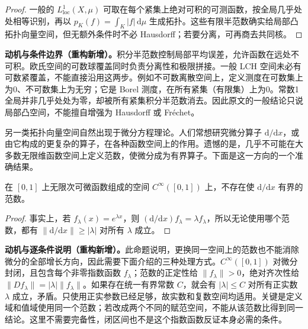 \documentclass[../../main.tex]{subfiles}
\begin{document}
\begin{examples}
\begin{itemize}
\begin{proof}
一般的 $L^1_{\mathrm{loc}}(X,\mu)$ 可取在每个紧集上绝对可积的可测函数，按全局几乎处处相等识别，再以 $p_K(f)=\int_K|f|\,\mathrm d\mu$ 生成拓扑。这些有限半范数确实给局部凸拓扑向量空间，但无额外条件时不必 Hausdorff；若要分离，可再商去共同核。
\end{proof}
\begin{remark}
\textbf{动机与条件边界（重构新增）。}积分半范数控制局部平均误差，允许函数在远处不可积。欧氏空间的可数球覆盖同时负责分离性和极限拼接。一般 LCH 空间未必有可数紧覆盖，不能直接沿用这两步。例如不可数离散空间上，定义测度在可数集上为0、不可数集上为无穷；它是 Borel 测度，在所有紧集（有限集）上为0。常数1全局并非几乎处处为零，却被所有紧集积分半范数消去。因此原文的一般结论只说局部凸空间，不能擅自增强为 Hausdorff 或 Fr\'echet。
\end{remark}
\end{itemize}
\end{examples}
另一类拓扑向量空间自然出现于微分方程理论。人们常想研究微分算子 $\mathrm d/\mathrm dx$，或由它构成的更复杂的算子，在各种函数空间上的作用。遗憾的是，几乎不可能在大多数无限维函数空间上定义范数，使微分成为有界算子。下面是这一方向的一个准确结果。
\begin{proposition}\label{proposition:ch05-differentiation-no-bounded-norm}
在 $[0,1]$ 上无限次可微函数组成的空间 $C^\infty([0,1])$ 上，不存在使 $\mathrm d/\mathrm dx$ 有界的范数。
\end{proposition}
\begin{proof}
事实上，若 $f_\lambda(x)=e^{\lambda x}$，则 $(\mathrm d/\mathrm dx)f_\lambda=\lambda f_\lambda$，所以无论使用哪个范数，都有 $\|\mathrm d/\mathrm dx\|\ge|\lambda|$ 对所有 $\lambda$ 成立。
\end{proof}
\begin{remark}
\textbf{动机与逐条件说明（重构新增）。}此命题说明，更换同一空间上的范数也不能消除微分的全部增长方向，因此需要下面介绍的三种处理方式。$C^\infty([0,1])$ 对微分封闭，且包含每个非零指数函数 $f_\lambda$；范数的正定性给 $\|f_\lambda\|>0$，绝对齐次性给 $\|Df_\lambda\|=|\lambda|\|f_\lambda\|$。如果存在统一有界常数 $C$，就会有 $|\lambda|\le C$ 对所有正实数 $\lambda$ 成立，矛盾。只使用正实参数已经足够，故实数和复数空间均适用。关键是定义域和值域使用同一个范数；若改成两个不同的赋范空间，不能从该范数比得到同一结论。这里不需要完备性，闭区间也不是这个指数函数反证本身必需的条件。
\end{remark}
\end{document}
